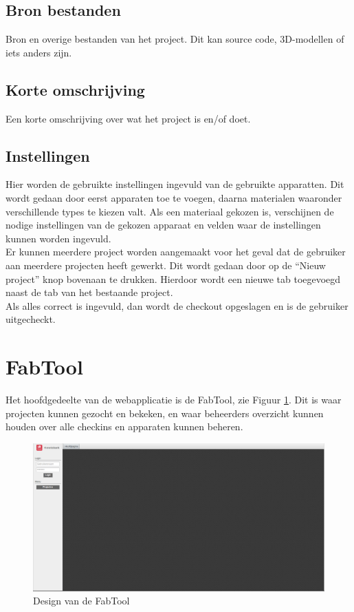 \subsection{Bron bestanden}

Bron en overige bestanden van het project. Dit kan source code, 3D-modellen of iets anders zijn.

\subsection{Korte omschrijving}

Een korte omschrijving over wat het project is en/of doet.

\subsection{Instellingen}

Hier worden de gebruikte instellingen ingevuld van de gebruikte apparatten. Dit wordt gedaan door eerst apparaten toe te voegen, daarna materialen waaronder verschillende types te kiezen valt. Als een materiaal gekozen is, verschijnen de nodige instellingen van de gekozen apparaat en velden waar de instellingen kunnen worden ingevuld. \\

Er kunnen meerdere project worden aangemaakt voor het geval dat de gebruiker aan meerdere projecten heeft gewerkt. Dit wordt gedaan door op de ``Nieuw project'' knop bovenaan te drukken. Hierdoor wordt een nieuwe tab toegevoegd naast de tab van het bestaande project. \\
Als alles correct is ingevuld, dan wordt de checkout opgeslagen en is de gebruiker uitgecheckt.

\section{FabTool}

Het hoofdgedeelte van de webapplicatie is de FabTool, zie Figuur \ref{fig:fabtool}. Dit is waar projecten kunnen gezocht en bekeken, en waar beheerders overzicht kunnen houden over alle checkins en apparaten kunnen beheren.

\begin{figure}[Hh]
	\centering
	\includegraphics[width=1\textwidth]{Images/fabtool.png}
	\caption{Design van de FabTool}
	\label{fig:fabtool}
\end{figure}

